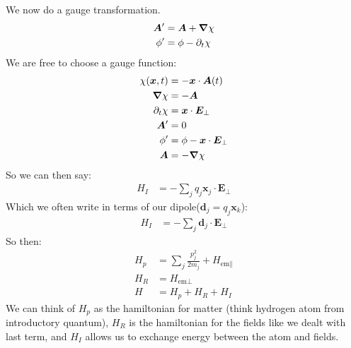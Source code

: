 We now do a gauge transformation. 
\begin{align*}
	\bm{A}' &= \bm{A} + \bm{\nabla}\chi \\
	\phi' &= \phi - \partial_t \chi
\end{align*}
We are free to choose a gauge function:
\begin{align*}
	\chi(\bm{x},t) &= -\bm{x}\cdot\bm{A}(t) \\
	\bm{\nabla}\chi &= -\bm{A} \\
	\partial_t \chi &= \bm{x}\cdot\bm{E}_\perp \\
	\bm{A}' &= 0 \\
	\phi' &= \phi - \bm{x}\cdot\bm{E}_\perp \\
	\bm{A} &= -\bm{\nabla}\chi
\end{align*}
So we can then say:
\begin{align*}
	H_I &= -\sum_j q_j\bm{x}_j\cdot\bm{E}_\perp
\end{align*}
Which we often write in terms of our dipole($\bm{d}_j = q_j\bm{x}_k$):
\begin{align*}
	H_I &= -\sum_j \bm{d}_j\cdot\bm{E}_\perp
\end{align*}
So then:
\begin{align*}
	H_p &= \sum_j \frac{p_j^2}{2m_j} + H_{\text{em}\parallel} \\
	H_R &= H_{\text{em}\perp} \\
	H &= H_p + H_R + H_I 
\end{align*}
We can think of $H_p$ as the hamiltonian for matter (think hydrogen atom from introductory quantum), $H_R$ is the hamiltonian for the fields like we dealt with last term, and $H_I$ allows us to exchange energy between the atom and fields.
